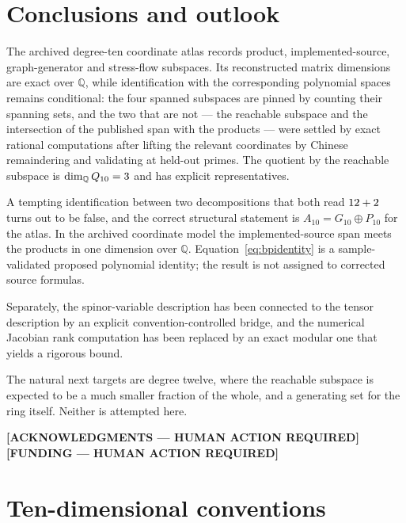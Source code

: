 \documentclass[11pt,a4paper]{article}
\newcommand{\HUMAN}[1]{\textbf{[#1 --- HUMAN ACTION REQUIRED]}}
\begin{document}
\section{Conclusions and outlook}
\label{sec:conclusions}

The archived degree-ten coordinate atlas records product, implemented-source,
graph-generator and stress-flow subspaces. Its reconstructed matrix dimensions
are exact over $\mathbb{Q}$, while identification with the corresponding
polynomial spaces remains conditional: the four spanned subspaces are pinned by counting their spanning sets, and
the two that are not --- the reachable subspace and the intersection of the
published span with the products --- were settled by exact rational computations
after lifting the relevant coordinates by Chinese remaindering and validating at
held-out primes. The quotient by the reachable subspace is
$\dim_{\mathbb{Q}} Q_{10} = 3$ and has explicit
representatives.

A tempting identification between two decompositions that both read
$12+2$ turns out to be false, and the correct structural statement
is $A_{10} = G_{10}\oplus P_{10}$ for the atlas. In the archived coordinate
model the implemented-source span meets the products in one dimension over
$\mathbb{Q}$. Equation~\eqref{eq:bpidentity} is a sample-validated proposed
polynomial identity; the result is not assigned to corrected source formulas.

Separately, the spinor-variable description has been connected to the tensor
description by an explicit convention-controlled bridge, and the numerical
Jacobian rank computation has been replaced by an exact modular one that yields a
rigorous bound.

The natural next targets are degree twelve, where the reachable subspace is
expected to be a much smaller fraction of the whole, and a generating set for the
ring itself. Neither is attempted here.

\acknowledgments
\HUMAN{ACKNOWLEDGMENTS}
\HUMAN{FUNDING}

\appendix

\section{Ten-dimensional conventions}
\label{app:conventions}

\end{document}
